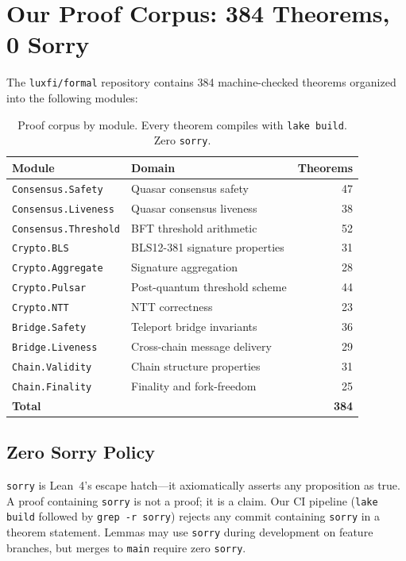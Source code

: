 \section{Our Proof Corpus: 384 Theorems, 0 Sorry}


The \texttt{luxfi/formal} repository contains 384 machine-checked theorems organized
into the following modules:

\begin{table}[H]
\centering
\small
\begin{tabular}{@{}llr@{}}
\toprule
\textbf{Module} & \textbf{Domain} & \textbf{Theorems} \\
\midrule
\texttt{Consensus.Safety} & Quasar consensus safety & 47 \\
\texttt{Consensus.Liveness} & Quasar consensus liveness & 38 \\
\texttt{Consensus.Threshold} & BFT threshold arithmetic & 52 \\
\texttt{Crypto.BLS} & BLS12-381 signature properties & 31 \\
\texttt{Crypto.Aggregate} & Signature aggregation & 28 \\
\texttt{Crypto.Pulsar} & Post-quantum threshold scheme & 44 \\
\texttt{Crypto.NTT} & NTT correctness & 23 \\
\texttt{Bridge.Safety} & Teleport bridge invariants & 36 \\
\texttt{Bridge.Liveness} & Cross-chain message delivery & 29 \\
\texttt{Chain.Validity} & Chain structure properties & 31 \\
\texttt{Chain.Finality} & Finality and fork-freedom & 25 \\
\bottomrule
\textbf{Total} & & \textbf{384} \\
\bottomrule
\end{tabular}
\caption{Proof corpus by module. Every theorem compiles with \texttt{lake build}. Zero \texttt{sorry}.}
\end{table}

\subsection{Zero Sorry Policy}

\texttt{sorry} is Lean~4's escape hatch---it axiomatically asserts any proposition as true.
A proof containing \texttt{sorry} is not a proof; it is a claim. Our CI pipeline
(\texttt{lake build} followed by \texttt{grep -r sorry}) rejects any commit containing
\texttt{sorry} in a theorem statement. Lemmas may use \texttt{sorry} during development
on feature branches, but merges to \texttt{main} require zero \texttt{sorry}.

